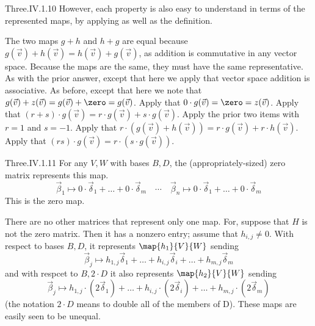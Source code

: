 \begin{ans}{Three.IV.1.10}
      However, each property
      is also easy to understand in terms of the represented
      maps, by applying  as well as
      the definition.
      \begin{exparts}
        \partsitem The two maps $g+h$ and $h+g$ are equal because
          $g(\vec{v})+h(\vec{v})=h(\vec{v})+g(\vec{v})$, as addition is
          commutative in any vector space.
          Because the maps are the same, they must have the same
          representative.
        \partsitem As with the prior answer, except that here we apply that
          vector space addition is associative.
        \partsitem As before, except that here we note that
          $g(\vec{v})+z(\vec{v})=g(\vec{v})+\zero=g(\vec{v})$.
        \partsitem Apply that
          $0\cdot g(\vec{v})=\zero=z(\vec{v})$.
        \partsitem Apply that
          $(r+s)\cdot g(\vec{v})=r\cdot g(\vec{v})+s\cdot g(\vec{v})$.
        \partsitem Apply the prior two items with $r=1$ and $s=-1$.
        \partsitem Apply that
          $r\cdot (g(\vec{v})+h(\vec{v}))=r\cdot g(\vec{v})+r\cdot h(\vec{v})$.
        \partsitem Apply that
          $(rs)\cdot g(\vec{v})=r\cdot(s\cdot g(\vec{v}))$.
      \end{exparts}
    
\end{ans}
\begin{ans}{Three.IV.1.11}
      For any \( V,W \) with bases \( B,D \),
      the (appropriately-sized) zero matrix represents this map.
      \begin{equation*}
        \vec{\beta}_1\mapsto 0\cdot\vec{\delta}_1+\dots+0\cdot\vec{\delta}_m
        \quad\cdots\quad
        \vec{\beta}_n\mapsto 0\cdot\vec{\delta}_1+\dots+0\cdot\vec{\delta}_m
      \end{equation*}
      This is the zero map.

      There are no other matrices that represent only one map.
      For, suppose that \( H \) is
      not the zero matrix.
      Then it has a nonzero entry; assume that \( h_{i,j}\neq 0 \).
      With respect to bases $B,D$, it represents \( \map{h_1}{V}{W} \)
      sending
      \begin{equation*}
        \vec{\beta}_j\mapsto
        h_{1,j}\vec{\delta}_1+\dots+h_{i,j}\vec{\delta}_i
          +\dots+h_{m,j}\vec{\delta}_m
      \end{equation*}
      and with respcet to $B,2\cdot D$ it also represents
      \( \map{h_2}{V}{W} \) sending
      \begin{equation*}
        \vec{\beta}_j\mapsto
        h_{1,j}\cdot(2\vec{\delta}_1)+\dots+h_{i,j}\cdot(2\vec{\delta}_i)
          +\dots+h_{m,j}\cdot(2\vec{\delta}_m)
      \end{equation*}
      (the notation $2\cdot D$ means to double
      all of the members of D).
      These maps are easily seen to be unequal.
     
\end{ans}
